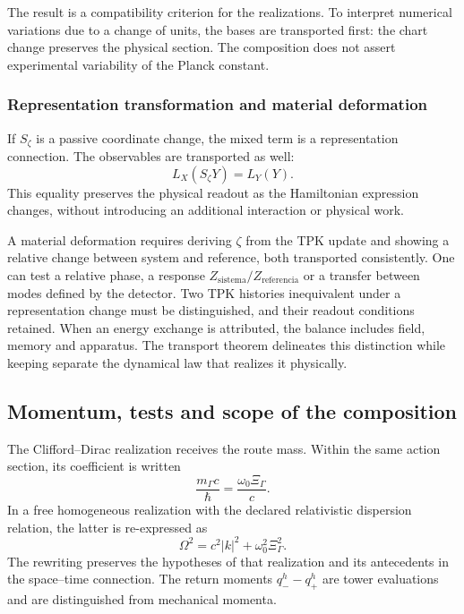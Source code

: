 The result is a compatibility criterion for the realizations. To interpret
numerical variations due to a change of units, the bases are transported
first: the chart change preserves the physical section. The composition
does not assert experimental variability of the Planck constant.

\subsubsection{Representation transformation and material deformation}
\label{md:hib:interpretacion-transporte}

If $S_\zeta$ is a passive coordinate change, the mixed term is a
representation connection. The observables are transported as well:
\begin{equation}
 L_X(S_\zeta Y)=L_Y(Y).
 \label{md:hib:observables-transportados}
\end{equation}
This equality preserves the physical readout as the Hamiltonian expression
changes, without introducing an additional interaction or physical work.

A material deformation requires deriving $\zeta$ from the TPK update and
showing a relative change between system and reference, both transported
consistently. One can test a relative phase, a response
$Z_{\mathrm{sistema}}/Z_{\mathrm{referencia}}$ or a transfer between
modes defined by the detector. Two TPK histories inequivalent under a
representation change must be distinguished, and their readout conditions
retained. When an energy exchange is attributed, the balance includes
field, memory and apparatus. The transport theorem delineates this
distinction while keeping separate the dynamical law that realizes it
physically.

\subsection{Momentum, tests and scope of the composition}
\label{md:hib:momento}

The Clifford--Dirac realization receives the route mass. Within the same
action section, its coefficient is written
\begin{equation}
 \frac{m_\Gamma c}{\hbar}
 =\frac{\omega_0\Xi_\Gamma}{c}.
 \label{md:hib:coeficiente-dirac}
\end{equation}
In a free homogeneous realization with the declared relativistic
dispersion relation, the latter is re-expressed as
\begin{equation}
 \Omega^2=c^2|k|^2+\omega_0^2\Xi_\Gamma^2.
 \label{md:hib:dispersion}
\end{equation}
The rewriting preserves the hypotheses of that realization and its
antecedents in the space--time connection. The return moments
$q_-^h-q_+^h$ are tower evaluations and are distinguished from mechanical
momenta.

